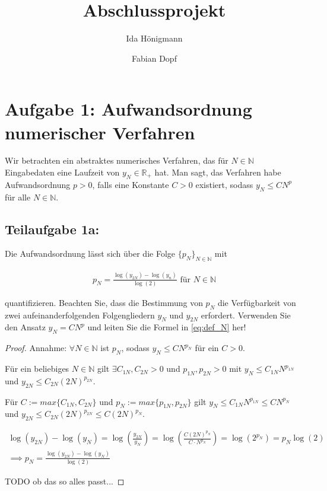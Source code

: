 \documentclass[]{article}
\title{Abschlussprojekt}
\author{Ida Hönigmann \and Fabian Dopf}
\begin{document}
\maketitle



\section*{Aufgabe 1: Aufwandsordnung numerischer Verfahren}
Wir betrachten ein abstraktes numerisches Verfahren, das für $N \in \mathbb{N}$ Eingabedaten eine Laufzeit von $y_N \in \mathbb{R}_+$ hat. Man sagt, das Verfahren habe Aufwandsordnung $p > 0$, falls eine Konstante $C > 0$ existiert, sodass $y_N \leq C N^p$ für alle $N \in \mathbb{N}$.

\subsection*{Teilaufgabe 1a:}
Die Aufwandsordnung lässt sich über die Folge $\{p_N\}_{N \in \mathbb{N}}$ mit

\begin{align}
	\label{eq:def_N}
	p_N = \frac{\log(y_{2N})-\log(y_n)}{\log(2)} \text{ für } N \in \mathbb{N}
\end{align}

quantifizieren. Beachten Sie, dass die Bestimmung von $p_N$ die Verfügbarkeit von zwei aufeinanderfolgenden Folgengliedern $y_N$ und $y_{2N}$ erfordert. Verwenden Sie den Ansatz $y_N = CN^p$ und leiten Sie die Formel in \ref{eq:def_N} her!

\begin{proof}
	Annahme: $\forall N \in \mathbb{N}$ ist $p_N$, sodass $y_N \leq C N^{p_N}$ für ein $C > 0$.
	
	Für ein beliebiges $N \in \mathbb{N}$ gilt $\exists C_{1N}, C_{2N} > 0$ und $p_{1N}, p_{2N} > 0$ mit $y_N \leq C_{1N} N^{p_{1N}}$ und $y_{2N} \leq C_{2N} (2N)^{p_{2N}}$.
	
	Für $C:=max\{C_{1N}, C_{2N}\}$ und $p_N:=max\{p_{1N}, p_{2N}\}$ gilt $y_N \leq C_{1N} N^{p_{1N}} \leq C N^{p_N}$ und $y_{2N} \leq C_{2N} (2N)^{p_{2N}} \leq C (2N)^{p_N}$.
	 
	\begin{align}
		\log(y_{2N}) - \log(y_N) = \log\left(\frac{y_{2N}}{y_N}\right) = \log\left(\frac{C(2N)^{p_N}}{C\cdot N^{p_N}}\right) = \log(2^{p_N}) = p_N \log(2) \\
		\implies p_N = \frac{\log(y_{2N}) - \log(y_N)}{\log(2)}
	\end{align}

	TODO ob das so alles passt...

\end{proof}
\end{document}
